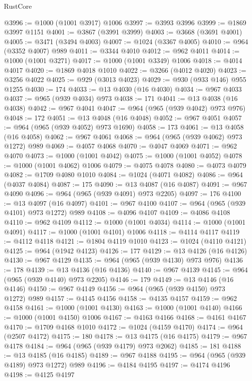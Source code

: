 \begin{lexlean}{RustCore}
\begin{coremodule}
@3996 := @1000 (@1001 @3917) @1006
@3997 := @3993 @3996
@3999 := @1869 @3997 @1151
@4001 := @3867 (@3991 @3999)
@4003 := @3668 (@3691 @4001)
@4005 := @3471 (@3494 @4003)
@4007 := @1024 (@3367 @4005)
@4010 := @964 (@3352 @4007) @989
@4011 := @3344 @4010
@4012 := @962 @4011
@4014 := @1000 (@1001 @3271)
@4017 := @1000 (@1001 @3349) @1006
@4018 := @4014 @4017
@4020 := @1869 @4018 @1010
@4022 := @3266 (@4012 @4020)
@4023 := @3256 @4022
@4025 := @929 (@3013 @4023)
@4029 := @930 (@933 @146) @955 @1255
@4030 := 174
@4033 := @13 @4030 (@16 @4030)
@4034 := @967 @4033
@4037 := @965 (@939 @4034) @973
@4038 := 171
@4041 := @13 @4038 (@16 @4038)
@4042 := @967 @4041
@4047 := @964 (@965 (@939 @4042) @973 @976)
@4048 := 172
@4051 := @13 @4048 (@16 @4048)
@4052 := @967 @4051
@4057 := @964 (@965 (@939 @4052) @973 @1690)
@4058 := 173
@4061 := @13 @4058 (@16 @4058)
@4062 := @967 @4061
@4068 := @964 (@965 (@939 @4062) @973 @1272) @989
@4069 := @4057 @4068
@4070 := @4047 @4069
@4071 := @962 @4070
@4073 := @1000 (@1001 @4042)
@4075 := @1000 (@1001 @4052)
@4078 := @1000 (@1001 @4062) @1006
@4079 := @4075 @4078
@4080 := @4073 @4079
@4082 := @1709 @4080 @1010
@4084 := @1024 (@4071 @4082)
@4086 := @964 (@4037 @4084)
@4087 := 175
@4090 := @13 @4087 (@16 @4087)
@4091 := @967 @4090
@4096 := @964 (@965 (@939 @4091) @973 @2205)
@4097 := 176
@4100 := @13 @4097 (@16 @4097)
@4101 := @967 @4100
@4107 := @964 (@965 (@939 @4101) @973 @1272) @989
@4108 := @4096 @4107
@4109 := @4086 @4108
@4110 := @962 @4109
@4112 := @1000 (@1001 @4034)
@4114 := @1000 (@1001 @4091)
@4117 := @1000 (@1001 @4101) @1006
@4118 := @4114 @4117
@4119 := @4112 @4118
@4121 := @1804 @4119 @1010
@4123 := @1024 (@4110 @4121)
@4125 := @964 (@1942 @4123)
@4126 := 177
@4129 := @13 @4126 (@16 @4126)
@4130 := @967 @4129
@4135 := @964 (@965 (@939 @4130) @973 @976)
@4136 := 178
@4139 := @13 @4136 (@16 @4136)
@4140 := @967 @4139
@4145 := @964 (@965 (@939 @4140) @973 @2205)
@4146 := 179
@4149 := @13 @4146 (@16 @4146)
@4150 := @967 @4149
@4156 := @964 (@965 (@939 @4150) @973 @1272) @989
@4157 := @4145 @4156
@4158 := @4135 @4157
@4159 := @962 @4158
@4161 := @1000 (@1001 @4130)
@4163 := @1000 (@1001 @4140)
@4166 := @1000 (@1001 @4150) @1006
@4167 := @4163 @4166
@4168 := @4161 @4167
@4170 := @1709 @4168 @1010
@4172 := @1024 (@4159 @4170)
@4174 := @964 (@2507 @4172)
@4175 := 180
@4178 := @13 @4175 (@16 @4175)
@4179 := @967 @4178
@4184 := @964 (@965 (@939 @4179) @973 @2062)
@4185 := 181
@4188 := @13 @4185 (@16 @4185)
@4189 := @967 @4188
@4195 := @964 (@965 (@939 @4189) @973 @1272) @989
@4196 := @4184 @4195
@4197 := @4174 @4196
@4198 := @4125 @4197

\end{coremodule}
\end{lexlean}

